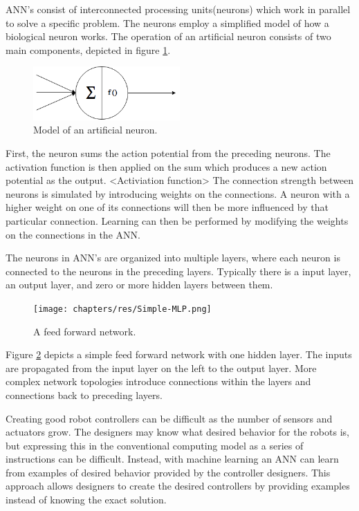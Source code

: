 ANN's consist of interconnected processing units(neurons) which work in parallel to solve a specific problem.
The neurons employ a simplified model of how a biological neuron works.
The operation of an artificial neuron consists of two main components, depicted in figure \ref{fig:artificial-neuron}.

\begin{figure}[H]
	
	\centering
	\includegraphics[width=0.5\textwidth]{chapters/res/Neuron.png}
	\caption{Model of an artificial neuron.}
	\label{fig:artificial-neuron}
\end{figure}
First, the neuron sums the action potential from the preceding neurons.
The activation function is then applied on the sum which produces a new action potential as the output.
<Activiation function>
The connection strength between neurons is simulated by introducing weights on the connections.
A neuron with a higher weight on one of its connections will then be more influenced by that particular connection.
Learning can then be performed by modifying the weights on the connections in the ANN.


The neurons in ANN's are organized into multiple layers, where each neuron is connected to the neurons in the preceding layers.
Typically there is a input layer, an output layer, and zero or more hidden layers between them.

\begin{figure}[H]
	\centering
	\texttt{[image: chapters/res/Simple-MLP.png]}
	\caption{A feed forward network.}
	\label{fig:mlp-simple}
\end{figure}

Figure \ref{fig:mlp-simple} depicts a simple feed forward network with one hidden layer.
The inputs are propagated from the input layer on the left to the output layer.
More complex network topologies introduce connections within the layers and connections back to preceding layers.

Creating good robot controllers can be difficult as the number of sensors and actuators grow.
The designers may know what desired behavior for the robots is, but expressing this in the conventional computing model as a series of instructions can be difficult.
Instead, with machine learning an ANN can learn from examples of desired behavior provided by the controller designers.
This approach allows designers to create the desired controllers by providing examples instead of knowing the exact solution.





